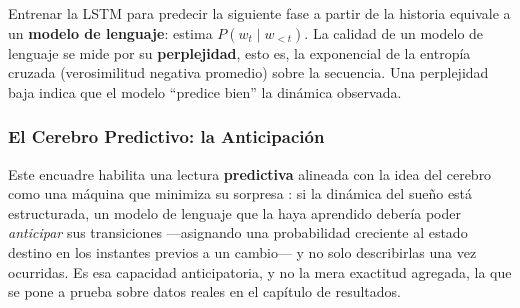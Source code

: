 Entrenar la LSTM para predecir la siguiente fase a partir de la historia equivale a un \textbf{modelo de lenguaje}: estima $P(w_t \mid w_{<t})$. La calidad de un modelo de lenguaje se mide por su \textbf{perplejidad}, esto es, la exponencial de la entropía cruzada (verosimilitud negativa promedio) sobre la secuencia. Una perplejidad baja indica que el modelo ``predice bien'' la dinámica observada.

\subsubsection{El Cerebro Predictivo: la Anticipación}

Este encuadre habilita una lectura \textbf{predictiva} alineada con la idea del cerebro como una máquina que minimiza su sorpresa \cite{friston2010free}: si la dinámica del sueño está estructurada, un modelo de lenguaje que la haya aprendido debería poder \textit{anticipar} sus transiciones ---asignando una probabilidad creciente al estado destino en los instantes previos a un cambio--- y no solo describirlas una vez ocurridas. Es esa capacidad anticipatoria, y no la mera exactitud agregada, la que se pone a prueba sobre datos reales en el capítulo de resultados.
